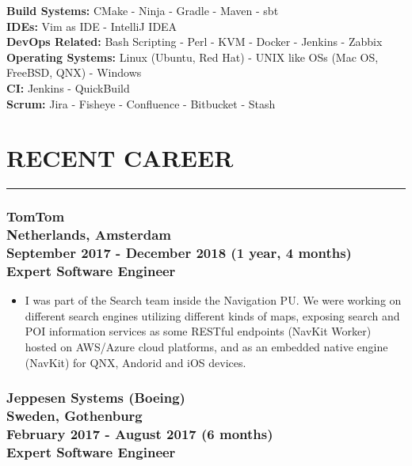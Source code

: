 \documentclass[10pt,a4paper]{article}
\begin{document}
\textbullet \hspace{0.1cm}\textbf{Build Systems:} CMake - Ninja - Gradle - Maven - sbt \\
\textbullet \hspace{0.1cm}\textbf{IDEs:} Vim as IDE - IntelliJ IDEA \\
\textbullet \hspace{0.1cm}\textbf{DevOps Related:} Bash Scripting - Perl - KVM - Docker - Jenkins - Zabbix \\
\textbullet \hspace{0.1cm}\textbf{Operating Systems:} Linux (Ubuntu, Red Hat) - UNIX like OSs (Mac OS, FreeBSD, QNX) - Windows \\
\textbullet \hspace{0.1cm}\textbf{CI:} Jenkins - QuickBuild \\
\textbullet \hspace{0.1cm}\textbf{Scrum:} Jira - Fisheye - Confluence - Bitbucket - Stash

\section{RECENT CAREER}
\noindent \rule {4.3cm}{0.4pt}
\subsubsection{{ \textbullet \hspace{0.1cm} \large TomTom} \\
\textnormal{Netherlands, Amsterdam} \\
\textnormal{September 2017 - December 2018 (1 year, 4 months)} \\
{Expert Software Engineer}}
  \setlength{\leftskip}{0.5cm}
  \setlength{\rightskip}{1cm}
  \begin{itemize}
    \setlength{\rightskip}{1cm}
    \setlength\itemsep{0em}
    \item I was part of the Search team inside the Navigation PU. We were working on different search engines utilizing different kinds of maps, exposing search and POI information services as some RESTful endpoints (NavKit Worker) hosted on AWS/Azure cloud platforms, and as an embedded native engine (NavKit) for QNX, Andorid and iOS devices.
  \end{itemize}
  \setlength{\leftskip}{0pt}
  \setlength{\rightskip}{0cm}

\subsubsection{{ \textbullet \hspace{0.1cm} \large Jeppesen Systems (Boeing)} \\
\textnormal{Sweden, Gothenburg} \\
\textnormal{February 2017 - August 2017 (6 months)} \\
{Expert Software Engineer}} \hfill
\end{document}
